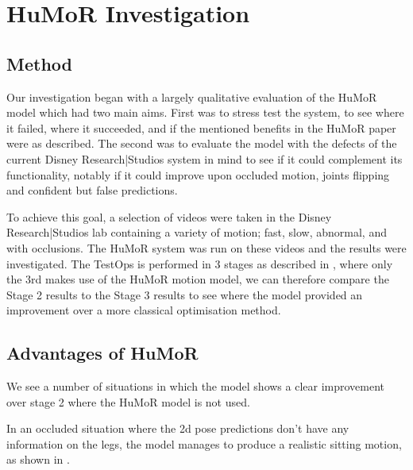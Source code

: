 \section{HuMoR Investigation}
\label{sec:humor_investigation}

\subsection{Method}
Our investigation began with a largely qualitative evaluation of the HuMoR model which had two main aims.  First was to stress test the system, to see where it failed, where it succeeded, and if the mentioned benefits in the HuMoR paper \cite{humor} were as described.  The second was to evaluate the model with the defects of the current Disney Research|Studios system in mind to see if it could complement its functionality, notably if it could improve upon occluded motion, joints flipping and confident but false predictions.

To achieve this goal, a selection of videos were taken in the Disney Research|Studios lab containing a variety of motion; fast, slow, abnormal, and with occlusions. The HuMoR system was run on these videos and the results were investigated. The TestOps is performed in 3 stages as described in , where only the 3rd makes use of the HuMoR motion model, we can therefore compare the Stage 2 results to the Stage 3 results to see where the model provided an improvement over a more classical optimisation method.

\subsection{Advantages of HuMoR}
We see a number of situations in which the model shows a clear improvement over stage 2 where the HuMoR model is not used.

In an occluded situation where the 2d pose predictions don't have any information on the legs, the model manages to produce a realistic sitting motion, as shown in .

